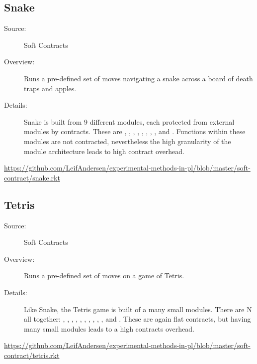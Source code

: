 \subsection*{Snake~\hrulefill}
\begin{description}
\item[Source:] Soft Contracts
\item[Overview:]
  Runs a pre-defined set of moves navigating a snake across a board of death traps and apples.
\item[Details:] 
  Snake is built from 9 different modules, each protected from external modules by contracts.
  These are , , , , , , , , and .
  Functions within these modules are not contracted, nevertheless the high granularity of the module architecture leads to high contract overhead.
\end{description}
\url{https://github.com/LeifAndersen/experimental-methods-in-pl/blob/master/soft-contract/snake.rkt}

\subsection*{Tetris~\hrulefill}
\begin{description}
\item[Source:] Soft Contracts
\item[Overview:]
  Runs a pre-defined set of moves on a game of Tetris.
\item[Details:] 
  Like Snake, the Tetris game is built of a many small modules.
  There are N all together: , , , , , , , , , , and .
  These are again flat contracts, but having many small modules leads to a high contracts overhead.
\end{description}
\url{https://github.com/LeifAndersen/experimental-methods-in-pl/blob/master/soft-contract/tetris.rkt}

